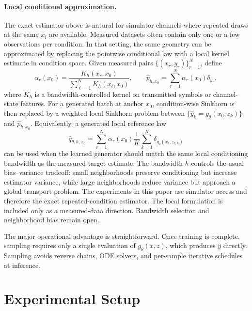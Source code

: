 \documentclass[10pt,journal]{IEEEtran}
\begin{document}
\paragraph{Local conditional approximation.}
The exact estimator above is natural for simulator channels where repeated draws at the same \(x_i\) are available.
Measured datasets often contain only one or a few observations per condition.
In that setting, the same geometry can be approximated by replacing the pointwise conditional law with a local kernel estimate in condition space.
Given measured pairs \(\{(x_r,y_r)\}_{r=1}^{N}\), define
\begin{equation}
\alpha_r(x_0)
=
\frac{K_h(x_r,x_0)}
{\sum_{\ell=1}^{N} K_h(x_\ell,x_0)},
\qquad
\hat p_{h,x_0}
=
\sum_{r=1}^{N}\alpha_r(x_0)\delta_{y_r},
\end{equation}
where \(K_h\) is a bandwidth-controlled kernel on transmitted symbols or channel-state features.
For a generated batch at anchor \(x_0\), condition-wise Sinkhorn is then replaced by a weighted local Sinkhorn problem between \(\{\hat y_k=g_\theta(x_0,z_k)\}\) and \(\hat p_{h,x_0}\).
Equivalently, a generated local reference law
\begin{equation}
\hat q_{\theta,h,x_0}
=
\sum_{r=1}^{N}\alpha_r(x_0)
\frac{1}{K}\sum_{k=1}^{K}\delta_{g_\theta(x_r,z_{r,k})}
\end{equation}
can be used when the learned generator should match the same local conditioning bandwidth as the measured target estimate.
The bandwidth \(h\) controls the usual bias--variance tradeoff: small neighborhoods preserve conditioning but increase estimator variance, while large neighborhoods reduce variance but approach a global transport problem.
The experiments in this paper use simulator access and therefore the exact repeated-condition estimator.
The local formulation is included only as a measured-data direction.
Bandwidth selection and neighborhood bias remain open.

The major operational advantage is straightforward.
Once training is complete, sampling requires only a single evaluation of \(g_\theta(x,z)\), which produces \(\hat y\) directly.
Sampling avoids reverse chains, ODE solvers, and per-sample iterative schedules at inference.

\section{Experimental Setup}
\end{document}

